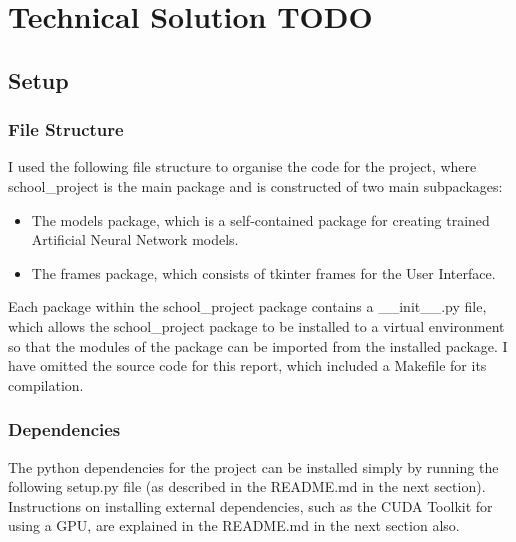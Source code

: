 \documentclass[./project-report/src/latex/project-report.tex]{subfiles}
\begin{document}
\maketitle

\section{Technical Solution TODO}

\subsection{Setup}

\subsubsection{File Structure}

I used the following file structure to organise the code for the project, where school\_project is the main package and is constructed of two main subpackages:

\begin{itemize}
    \item The models package, which is a self-contained package for creating trained Artificial Neural Network models.
    \item The frames package, which consists of tkinter frames for the User Interface.
\end{itemize}

Each package within the school\_project package contains a \_\_init\_\_.py file, which allows the school\_project package to be installed to a virtual environment 
so that the modules of the package can be imported from the installed package. I have omitted the source code for this report, which included a Makefile for its 
compilation.

\pagebreak

\begin{footnotesize}

\end{footnotesize}

\subsubsection{Dependencies}

The python dependencies for the project can be installed simply by running the following setup.py file (as described in the README.md in the next section). Instructions on 
installing external dependencies, such as the CUDA Toolkit for using a GPU, are explained in the README.md in the next section also.
\end{document}
